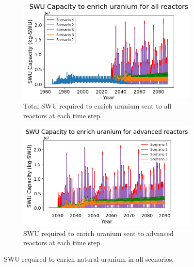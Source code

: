 \begin{figure}
    \centering
    \begin{subfigure}{0.45\textwidth}
        \centering
        \includegraphics[scale=0.4]{../figures/totalswu_scenarios_all.png}
        \caption{Total \gls{SWU} required to enrich uranium sent to all reactors at each time step.}
        \label{fig:totalswu_all}
    \end{subfigure}
    \hspace{1.8cm}
    \begin{subfigure}{0.45\textwidth}
        \centering
        \includegraphics[scale=0.4]{../figures/haleuSWU_scenarios_all.png}
        \caption{\gls{SWU} required to enrich uranium sent to advanced reactors at each time step.}
        \label{fig:haleuswu_al}
    \end{subfigure}
    \caption{\gls{SWU} required to enrich natural uranium in all scenarios.}
    \label{fig:swu_all}
\end{figure}

